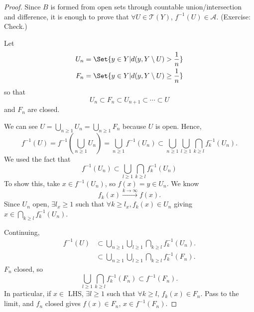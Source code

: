 \documentclass[twoside]{article}
\begin{document}
\begin{proof}
    Since $B$ is formed from open sets through countable union/intersection and difference, it is enough to prove that $\forall U \in \mathscr{T}(Y)$, $f^{-1}(U) \in \mathscr{A}$. (Exercise: Check.)

    Let
    \begin{align*}
        U_n &= \Set{y \in Y | d(y, Y \setminus U) > \frac{1}{n}} \\
        F_n &= \Set{y \in Y | d(y, Y \setminus U) \geq \frac{1}{n}}
    \end{align*}
    so that
    \begin{equation*}
        U_n \subset F_n \subset U_{n+1} \subset \dotsb \subset U
    \end{equation*}
    and $F_n$ are closed.

    We can see $U = \bigcup_{n \geq 1} U_n = \bigcup_{n \geq 1} F_n$ because $U$ is open. %
    Hence,
    \begin{equation*}
        f^{-1}(U) = f^{-1} \left(\bigcup_{n \geq 1} U_n\right) = \bigcup_{n \geq 1} f^{-1}(U_n) \subset \bigcup_{n \geq 1} \bigcup_{l \geq 1} \bigcap_{k \geq l} f^{-1}_k(U_n).
    \end{equation*}
    We used the fact that
    \begin{equation*}f^{-1}(U_n) \subset \bigcup_{l \geq 1} \bigcap_{k \geq l} f_k^{-1}(U_n)\end{equation*}
    To show this, take $x \in f^{-1}(U_n)$, so $f(x) = y \in U_n$.
    We know
    \begin{equation*}
        f_k(x) \xrightarrow{k \to \infty} f(x).
    \end{equation*}
    Since $U_n$ open, $\exists l_x \geq 1$ such that $\forall k \geq l_x, f_k(x) \in U_n$ giving $x \in \bigcap_{k \geq l} f_k^{-1}(U_n)$.

    Continuing,
    \begin{align*}
        f^{-1}(U) &\subset \bigcup_{n \geq 1} \bigcup_{l \geq 1} \bigcap_{k \geq l} f_k^{-1}(U_n). \\
        &\subset \bigcup_{n \geq 1} \bigcup_{l \geq 1} \bigcap_{k \geq l} f_k^{-1}(F_n).
    \end{align*}
    $F_n$ closed, so
    \begin{equation*}
        \bigcup_{l \geq 1} \bigcap_{k \geq l} f_k^{-1} (F_n) \subset f^{-1}(F_n).
    \end{equation*}
    In particular, if $x \in$ LHS, $\exists l \geq 1$ such that $\forall k \geq l$, $f_k(x) \in F_n$.
    Pass to the limit, and $f_n$ closed gives $f(x) \in F_n$, $x \in f^{-1}(F_n)$.


\end{proof}
\end{document}

